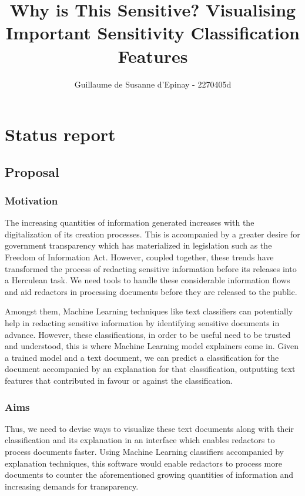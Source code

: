 \documentclass[11pt,a4paper,british]{article}
\title{Why is This Sensitive? Visualising Important Sensitivity Classification Features}
\author{Guillaume de Susanne d'Epinay - 2270405d}
\begin{document}
\maketitle


\section{Status report}

\subsection{Proposal}\label{proposal}

\subsubsection{Motivation}\label{motivation}

The increasing quantities of information generated increases with the digitalization of its creation processes.
This is accompanied by a greater desire for government transparency which has materialized in legislation such as the Freedom of Information Act.
However, coupled together, these trends have transformed the process of redacting sensitive information before its releases into a Herculean task.
We need tools to handle these considerable information flows and aid redactors in processing documents before they are released to the public.

Amongst them, Machine Learning techniques like text classifiers can potentially help in redacting sensitive information by identifying sensitive documents in advance. However, these classifications, in order to be useful need to be trusted and understood, this is where Machine Learning model explainers come in. Given a trained model and a text document, we can predict a classification for the document accompanied by an explanation for that classification, outputting text features that contributed in favour or against the classification.

\subsubsection{Aims}\label{aims}

Thus, we need to devise ways to visualize these text documents along with their classification and its explanation in an interface which enables redactors to process documents faster. Using Machine Learning classifiers accompanied by explanation techniques, this software would enable redactors to process more documents to counter the aforementioned growing quantities of information and increasing demands for transparency.
\end{document}
